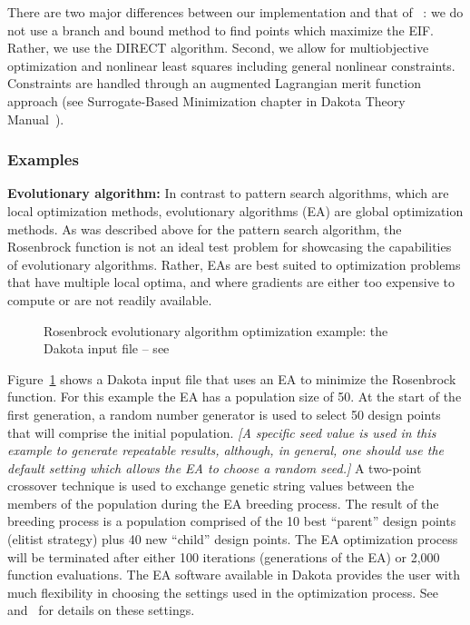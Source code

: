 There are two major differences between our implementation and that of
~\cite{Jon98}: we do not use a branch and bound method to find points
which maximize the EIF.  Rather, we use the DIRECT algorithm.  Second,
we allow for multiobjective optimization and nonlinear least squares
including general nonlinear constraints.  Constraints are handled
through an augmented Lagrangian merit function approach (see
Surrogate-Based Minimization chapter in Dakota Theory
Manual~\cite{TheoMan}).

\subsubsection{Examples}
\label{opt:methods:gradientfree:global:example}

{\bf Evolutionary algorithm:} In contrast to pattern search
algorithms, which are local optimization methods, evolutionary
algorithms (EA) are global optimization methods. As was described
above for the pattern search algorithm, the Rosenbrock function is not
an ideal test problem for showcasing the capabilities of evolutionary
algorithms. Rather, EAs are best suited to optimization problems that
have multiple local optima, and where gradients are either too
expensive to compute or are not readily available.

\begin{figure}[ht!]
  \centering
  \begin{bigbox}
    \begin{small}
    \end{small}
  \end{bigbox}
  \caption{Rosenbrock evolutionary algorithm optimization example: the
  Dakota input file --
see \protect{} }
  \label{opt:methods:gradientfree:global:example:rosenbrock_ea}
\end{figure}

Figure~\ref{opt:methods:gradientfree:global:example:rosenbrock_ea}
shows a Dakota input file that uses an EA to minimize the Rosenbrock
function. For this example the EA has a population size of 50. At the
start of the first generation, a random number generator is used to
select 50 design points that will comprise the initial
population. \emph{[A specific seed value is used in this example to
  generate repeatable results, although, in general, one should use
  the default setting which allows the EA to choose a random seed.]} A
two-point crossover technique is used to exchange genetic string
values between the members of the population during the EA breeding
process. The result of the breeding process is a population comprised
of the 10 best ``parent'' design points (elitist strategy) plus 40 new
``child'' design points. The EA optimization process will be
terminated after either 100 iterations (generations of the EA) or
2,000 function evaluations. The EA software available in Dakota
provides the user with much flexibility in choosing the settings used
in the optimization process. See~\cite{RefMan} and~\cite{Har06} for
details on these settings.

